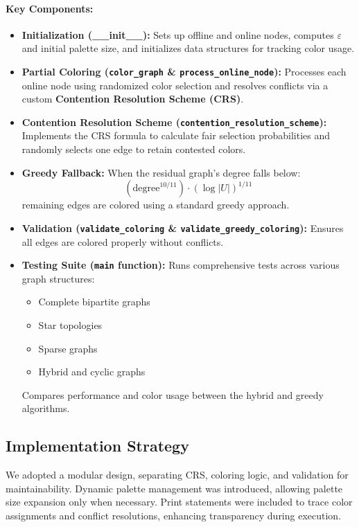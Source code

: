 \documentclass[11pt]{article}
\begin{document}
\paragraph{Key Components:}
\begin{itemize}
    \item \textbf{Initialization (\_\_init\_\_):} 
    Sets up offline and online nodes, computes $\varepsilon$ and initial palette size, and initializes data structures for tracking color usage.
    
    \item \textbf{Partial Coloring (\texttt{color\_graph} \& \texttt{process\_online\_node}):} 
    Processes each online node using randomized color selection and resolves conflicts via a custom \textbf{Contention Resolution Scheme (CRS)}.
    
    \item \textbf{Contention Resolution Scheme (\texttt{contention\_resolution\_scheme}):} 
    Implements the CRS formula to calculate fair selection probabilities and randomly selects one edge to retain contested colors.
    
    \item \textbf{Greedy Fallback:} 
    When the residual graph's degree falls below:
    \[
    \left( \text{degree}^{10/11} \right) \cdot \left( \log |U| \right)^{1/11}
    \]
    remaining edges are colored using a standard greedy approach.
    
    \item \textbf{Validation (\texttt{validate\_coloring} \& \texttt{validate\_greedy\_coloring}):} 
    Ensures all edges are colored properly without conflicts.
    
    \item \textbf{Testing Suite (\texttt{main} function):} 
    Runs comprehensive tests across various graph structures:
    \begin{itemize}
        \item Complete bipartite graphs
        \item Star topologies
        \item Sparse graphs
        \item Hybrid and cyclic graphs
    \end{itemize}
    Compares performance and color usage between the hybrid and greedy algorithms.
\end{itemize}

\subsection*{Implementation Strategy}
We adopted a modular design, separating CRS, coloring logic, and validation for maintainability. Dynamic palette management was introduced, allowing palette size expansion only when necessary. Print statements were included to trace color assignments and conflict resolutions, enhancing transparency during execution.
\end{document}
